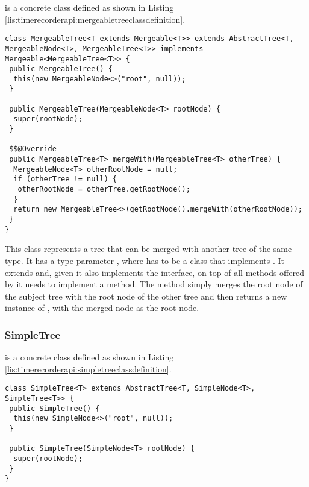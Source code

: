  is a concrete class defined as shown in Listing \ref{lis:timerecorderapi:mergeabletreeclassdefinition}.

\noindent\begin{minipage}[c]{\linewidth}
\begin{lstlisting}[breaklines,caption={MergeableTree class definition},label=lis:timerecorderapi:mergeabletreeclassdefinition]
class MergeableTree<T extends Mergeable<T>> extends AbstractTree<T, MergeableNode<T>, MergeableTree<T>> implements Mergeable<MergeableTree<T>> {
 public MergeableTree() {
  this(new MergeableNode<>("root", null));
 }

 public MergeableTree(MergeableNode<T> rootNode) {
  super(rootNode);
 }

 $$@Override
 public MergeableTree<T> mergeWith(MergeableTree<T> otherTree) {
  MergeableNode<T> otherRootNode = null;
  if (otherTree != null) {
   otherRootNode = otherTree.getRootNode();
  }
  return new MergeableTree<>(getRootNode().mergeWith(otherRootNode));
 }
}
\end{lstlisting}
\end{minipage}

\noindent This class represents a tree that can be merged with another tree of the same type. It has a type parameter , where  has to be a class that implements . It extends  and, given it also implements the  interface, on top of all methods offered by  it needs to implement a  method. The  method simply merges the root node of the subject tree with the root node of the other tree and then returns a new instance of , with the merged node as the root node.

\subsubsection{SimpleTree}

 is a concrete class defined as shown in Listing \ref{lis:timerecorderapi:simpletreeclassdefinition}.

\noindent\begin{minipage}[c]{\linewidth}
\begin{lstlisting}[breaklines,caption={SimpleTree class definition},label=lis:timerecorderapi:simpletreeclassdefinition]
class SimpleTree<T> extends AbstractTree<T, SimpleNode<T>, SimpleTree<T>> {
 public SimpleTree() {
  this(new SimpleNode<>("root", null));
 }

 public SimpleTree(SimpleNode<T> rootNode) {
  super(rootNode);
 }
}
\end{lstlisting}
\end{minipage}

